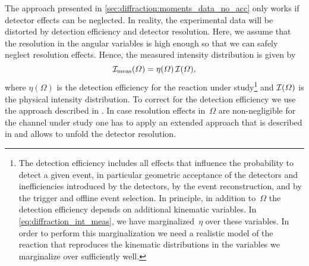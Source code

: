 The approach presented in \cref{sec:diffraction:moments_data_no_acc}
only works if detector effects can be neglected.  In reality, the
experimental data will be distorted by detection efficiency and
detector resolution.  Here, we assume that the resolution in the
angular variables is high enough so that we can safely neglect
resolution effects.  Hence, the measured intensity distribution is
given by
\begin{equation}
  \label{eq:diffraction_int_meas}
  \mathcal{I}_\text{meas}(\Omega)
  = \eta(\Omega)\, \mathcal{I}(\Omega),
\end{equation}
where $\eta(\Omega)$ is the detection efficiency for the reaction
under study\footnote{The detection efficiency includes all effects
that influence the probability to detect a given event, in particular
geometric acceptance of the detectors and inefficiencies introduced by
the detectors, by the event reconstruction, and by the trigger and
offline event selection.  In principle, in addition to~$\Omega$ the
detection efficiency depends on additional kinematic variables.  In
\cref{eq:diffraction_int_meas}, we have marginalized~$\eta$ over these
variables.  In order to perform this marginalization we need a
realistic model of the reaction that reproduces the kinematic
distributions in the variables we marginalize over sufficiently well.}
and $\mathcal{I}(\Omega)$ is the physical intensity distribution.  To
correct for the detection efficiency we use the approach described in
.
In case resolution effects in~$\Omega$ are non-negligible for the
channel under study one has to apply an extended approach that is
described in 
and allows to unfold the detector resolution.

